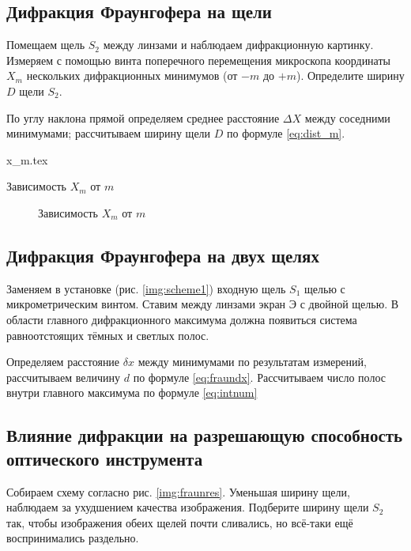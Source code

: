 \documentclass[a5paper,10pt, twoside]{article} %
\begin{document}
\subsection{Дифракция Фраунгофера на щели}

Помещаем щель $S_2$ между линзами и наблюдаем дифракционную картинку. Измеряем с помощью винта 
поперечного перемещения микроскопа координаты $X_m$ нескольких дифракционных минимумов 
(от $-m$ до $+m$). Определите ширину $D$ щели $S_2$.

По углу наклона прямой определяем среднее расстояние $\Delta X$ между соседними минимумами;
рассчитываем ширину щели $D$ по формуле \eqref{eq:dist_m}.

\begin{table}[h]
	\begin{center}
		{x_m.tex}
	\end{center}
	\caption{Зависимость $X_m$ от $m$}
\end{table}

\begin{figure}[h]
	\caption{Зависимость $X_m$ от $m$} 
\end{figure}

\subsection{Дифракция Фраунгофера на двух щелях}

Заменяем в установке (рис. \ref{img:scheme1}) входную щель $S_1$ щелью с микрометрическим винтом.
Ставим между линзами экран Э с двойной щелью. В области главного дифракционного максимума должна 
появиться система равноотстоящих тёмных и светлых полос.

Определяем расстояние $\delta x$ между минимумами по результатам измерений, рассчитываем величину 
$d$ по формуле \eqref{eq:fraundx}. Рассчитываем число полос внутри главного максимума по формуле 
\eqref{eq:intnum}

\subsection{Влияние дифракции на разрешающую способность оптического инструмента}

Собираем схему согласно рис. \ref{img:fraunres}. Уменьшая ширину щели, наблюдаем за ухудшением 
качества изображения. Подберите ширину щели $S_2$ так, чтобы изображения обеих щелей почти сливались, 
но всё-таки ещё воспринимались раздельно.
\end{document}
